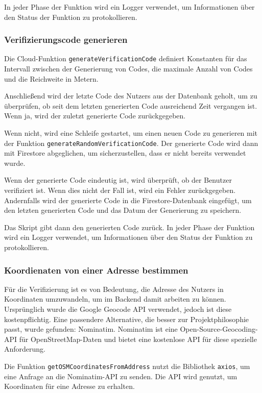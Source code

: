 In jeder Phase der Funktion wird ein Logger verwendet, um Informationen über den Status der Funktion zu protokollieren.

\subsubsection{Verifizierungscode generieren}
Die Cloud-Funktion \texttt{generateVerificationCode} definiert Konstanten für das Intervall zwischen der Generierung von Codes, die maximale Anzahl von Codes und die Reichweite in Metern.

Anschließend wird der letzte Code des Nutzers aus der Datenbank geholt, um zu überprüfen, ob seit dem letzten generierten Code ausreichend Zeit vergangen ist. Wenn ja, wird der zuletzt generierte Code zurückgegeben.

Wenn nicht, wird eine Schleife gestartet, um einen neuen Code zu generieren mit der Funktion \texttt{generateRandomVerificationCode}. Der generierte Code wird dann mit Firestore abgeglichen, um sicherzustellen, dass er nicht bereits verwendet wurde.

Wenn der generierte Code eindeutig ist, wird überprüft, ob der Benutzer verifiziert ist. Wenn dies nicht der Fall ist, wird ein Fehler zurückgegeben. Andernfalls wird der generierte Code in die Firestore-Datenbank eingefügt, um den letzten generierten Code und das Datum der Generierung zu speichern.

Das Skript gibt dann den generierten Code zurück. In jeder Phase der Funktion wird ein Logger verwendet, um Informationen über den Status der Funktion zu protokollieren.

\subsubsection{Koordienaten von einer Adresse bestimmen}
Für die Verifizierung ist es von Bedeutung, die Adresse des Nutzers in Koordinaten umzuwandeln, um im Backend damit arbeiten zu können. Ursprünglich wurde die Google Geocode API verwendet, jedoch ist diese kostenpflichtig. Eine passendere Alternative, die besser zur Projektphilosophie passt, wurde gefunden: Nominatim. Nominatim ist eine Open-Source-Geocoding-API für OpenStreetMap-Daten und bietet eine kostenlose API für diese spezielle Anforderung.

Die Funktion \texttt{getOSMCoordinatesFromAddress} nutzt die Bibliothek \texttt{axios}, um eine Anfrage an die Nominatim-API zu senden. Die API wird genutzt, um Koordinaten für eine Adresse zu erhalten.

